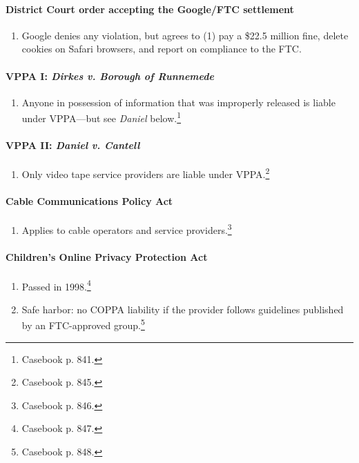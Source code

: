 \paragraph{District Court order accepting the Google/FTC settlement}

\begin{enumerate}
    \item Google denies any violation, but agrees to (1) pay a \$22.5 million 
    fine, delete cookies on Safari browsers, and report on compliance to the 
    FTC.
\end{enumerate}

\paragraph{VPPA I: \emph{Dirkes v. Borough of Runnemede}}

\begin{enumerate}
    \item Anyone in possession of information that was improperly released is 
    liable under VPPA---but see \emph{Daniel} below.\footnote{Casebook p. 841.}
\end{enumerate}

\paragraph{VPPA II: \emph{Daniel v. Cantell}}

\begin{enumerate}
    \item Only video tape service providers are liable under 
    VPPA.\footnote{Casebook p. 845.}
\end{enumerate}

\paragraph{Cable Communications Policy Act}

\begin{enumerate}
    \item Applies to cable operators and service providers.\footnote{Casebook p. 
    846.}
\end{enumerate}

\paragraph{Children's Online Privacy Protection Act}

\begin{enumerate}
    \item Passed in 1998.\footnote{Casebook p. 847.}
    \item Safe harbor: no COPPA liability if the provider follows guidelines 
    published by an FTC-approved group.\footnote{Casebook p. 848.}
\end{enumerate}

